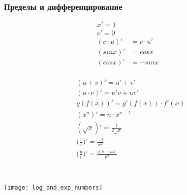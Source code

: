 \documentclass[10pt,a4paper]{scrartcl}
\begin{document}
\subsubsection*{Пределы и дифференцирование}
	\begin{minipage}{0.3\linewidth}			
		\begin{align*}
		x' = 1 \\
		c' = 0 \\
		(c \cdot u)' &= c \cdot u' \\
		(sin x)' &= cos x\\
		(cos x)' &= -sin x \\
		\end{align*}
	\end{minipage}
	\begin{minipage}{0.7\linewidth}
		\begin{align*}
		&(u + v)' = u' + v' \\
		&(u \cdot v)' = u'v + uv' \\
		&g(f(x))' = g'(f(x)) \cdot f'(x)\\
		&(x^n)' = n \cdot x^{n-1} \\
		&(\sqrt{x})' = \frac {1}{2 \sqrt{x}}	\\
		&\bigg(\frac{1}{x}\bigg)' = \frac{-1}{x^2} \\
		&\bigg(\frac{u}{v}\bigg)' = \frac{u'v  - uv'}{v^2}
		\end{align*}
	\end{minipage}
	\\
	\begin{minipage}{1\linewidth}
	\texttt{[image: log\_and\_exp\_numbers]}
	\end{minipage}
\end{document}
